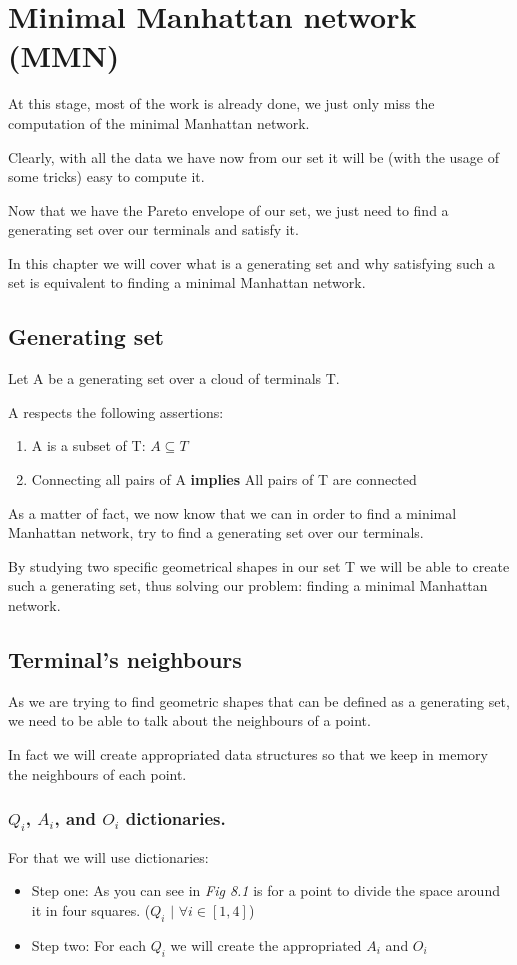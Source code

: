 \chapter{Minimal Manhattan network (MMN)}
At this stage, most of the work is already done, we just only miss the computation of the minimal Manhattan network.

Clearly, with all the data we have now from our set it will be (with the usage of some tricks) easy to compute it.

Now that we have the Pareto envelope of our set, we just need to find a generating set over our terminals and satisfy it.

In this chapter we will cover what is a generating set and why satisfying such a set is equivalent to finding a minimal Manhattan network.
\section{Generating set}%
\noindent Let A be a generating set over a cloud of terminals T.

\noindent A respects the following assertions:
\begin{enumerate}
	\item{A is a subset of T: $A \subseteq T$ }
	\item{Connecting all pairs of A \textbf{implies} All pairs of T are connected }
\end{enumerate}

\noindent As a matter of fact, we now know that we can in order to find a minimal Manhattan network, try to find a generating set over our terminals.

By studying two specific geometrical shapes in our set T we will be able to create such a generating set, thus solving our problem: finding a minimal Manhattan network.
\section{Terminal's neighbours}%
As we are trying to find geometric shapes that can be defined as a generating set, we need to be able to talk about the neighbours of a point.

In fact we will create appropriated data structures so that we keep in memory the neighbours of each point.

\subsection{$Q_i$, $A_i$, and $O_i$ dictionaries.}
\noindent For that we will use dictionaries:
\begin{itemize}[noitemsep, nolistsep]
	\item{Step one: As you can see in \emph{Fig 8.1} is for a point to divide the space around it in four squares. ($Q_i$ $|$ $\forall i \in [1,4]$) }
	\item{Step two: For each $Q_i$ we will create the appropriated $A_i$ and $O_i$}
\end{itemize}

